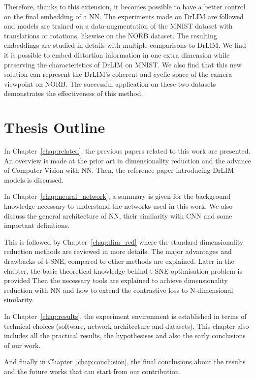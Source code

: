 \documentclass[a4paper,12pt]{report}
\begin{document}
Therefore, thanks to this extension, it becomes possible to have a better control on the final embedding of a NN.
The experiments made on DrLIM are followed and models are trained on a data-augmentation of the MNIST dataset\cite{lecun1998mnist} with translations or rotations, likewise on the NORB dataset\cite{lecun2004learning}.
The resulting embeddings are studied in details with multiple comparisons to DrLIM.
We find it is possible to embed distortion information in one extra dimension while preserving the characteristics of DrLIM on MNIST.
We also find that this new solution can represent the DrLIM's coherent and cyclic space of the camera viewpoint on NORB.
The successful application on these two datasets demonstrates the effectiveness of this method.

\section{Thesis Outline}
In Chapter~\ref{chap:related}, the previous papers related to this work are presented.
An overview is made at the prior art in dimensionality reduction and the advance of Computer Vision with NN.
Then, the reference paper introducing DrLIM models is discussed.

In Chapter~\ref{chap:neural_network}, a summary is given for the background knowledge necessary to understand the networks used in this work.
We also discuss the general architecture of NN, their similarity with CNN and some important definitions.

This is followed by Chapter~\ref{chap:dim_red} where the standard dimensionality reduction methods are reviewed in more details.
The major advantages and drawbacks of t-SNE, compared to other methods are explained.
Later in the chapter, the basic theoretical knowledge behind t-SNE optimisation problem is provided
Then the necessary tools are explained to achieve dimensionality reduction with NN and how to extend the contrastive loss to N-dimensional similarity.

In Chapter~\ref{chap:results}, the experiment environment is established in terms of technical choices (software, network architecture and datasets).
This chapter also includes all the practical results, the hypothesises and also the early conclusions of our work.

And finally in Chapter~\ref{chap:conclusion}, the final conclusions about the results and the future works that can start from our contribution.
\end{document}
